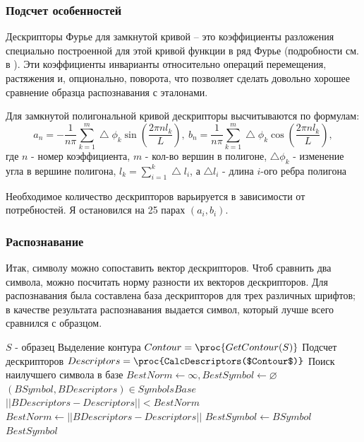 \subsubsection*{Подсчет особенностей}
\par Дескрипторы Фурье для замкнутой кривой -- это коэффициенты разложения 
специально построенной для этой кривой функции в ряд Фурье (подробности см. в \cite{zahn}). Эти коэффициенты инварианты относительно 
операций перемещения, растяжения и, опционально, поворота, что позволяет сделать довольно хорошее сравнение образца
распознавания с эталонами.

Для замкнутой полигональной кривой дескрипторы высчитываются по формулам:
\[
  a_n = -\frac{1}{n\pi}\sum_{k=1}^{m}\bigtriangleup\phi_k\sin(\frac{2\pi n l_k}{L}),~
  b_n = \frac{1}{n\pi}\sum_{k=1}^{m}\bigtriangleup\phi_k\cos(\frac{2\pi n l_k}{L}),
\]
где $n$ - номер коэффициента, $m$ - кол-во вершин в полигоне, $\bigtriangleup\phi_k$ - изменение угла в вершине полигона,
$l_k = \sum_{i=1}^{k}\bigtriangleup l_i$, а $\bigtriangleup l_i$ - длина $i$-ого ребра полигона

Необходимое количество дескрипторов варьируется в зависимости от потребностей. Я остановился на 25 парах $(a_i, b_i)$.
\subsubsection*{Распознавание}
\par Итак, символу можно сопоставить вектор дескрипторов. Чтоб сравнить два символа, можно посчитать норму разности их 
векторов дескрипторов. Для распознавания была составлена база дескрипторов для трех различных шрифтов; в качестве 
результата распознавания выдается символ, который лучше всего сравнился с образцом.

\begin{codebox}
  \li \Comment $S$ - образец
  \li
  \li \Comment Выделение контура
  \li $Contour = \proc{GetContour(S)}$
  \li
  \li \Comment Подсчет дескрипторов
  \li $Descriptors = \proc{CalcDescriptors($Contour$)}$
  \li
  \li \Comment Поиск наилучшего символа в базе
  \li $BestNorm \gets \infty, BestSymbol \gets \varnothing$
  \li \For $(BSymbol, BDescriptors) \in SymbolsBase$
    \li \Do
    \li	\If $||BDescriptors - Descriptors|| < BestNorm$
    \li \Then
    \li $BestNorm \gets ||BDescriptors - Descriptors||$
    \li $BestSymbol \gets BSymbol$
    \li \End
  \li \End
  \li \Return $BestSymbol$
\end{codebox}

